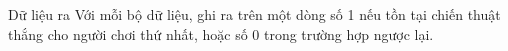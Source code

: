 Dữ liệu ra
Với mỗi bộ dữ liệu, ghi ra trên một dòng số 1 nếu tồn tại chiến thuật thắng cho người chơi thứ nhất, hoặc số 0 trong trường hợp ngược lại.